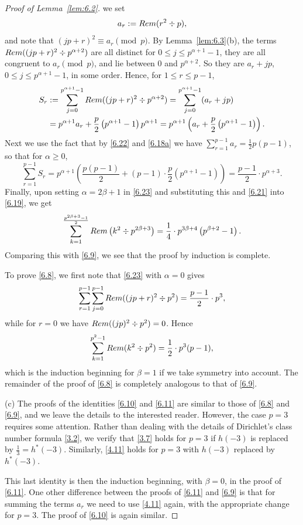 \documentclass[10pt,a4paper]{amsart}
\begin{document}
\begin{proof}[Proof of Lemma~\ref{lem:6.2}]
we set
\begin{equation}\label{6.22}
a_r := {\rm Rem}(r^2\div p),
\end{equation}
and note that $(jp+r)^2\equiv a_r\pmod{p}$. By Lemma~\ref{lem:6.3}(b), the
terms ${\rm Rem}((jp+r)^2\div p^{\alpha+2})$ are all distinct for
$0\leq j\leq p^{\alpha+1}-1$, they are all congruent to $a_r\pmod{p}$, and lie
between 0 and $p^{\alpha+2}$. So they are $a_r+jp$, 
$0\leq j\leq p^{\alpha+1}-1$, in some order. Hence, for $1\leq r\leq p-1$,
\begin{align*}
S_r&:=\sum_{j=0}^{p^{\alpha+1}-1}{\rm Rem}((jp+r)^2\div p^{\alpha+2})
=\sum_{j=0}^{p^{\alpha+1}-1}(a_r+jp) \\
&= p^{\alpha+1}a_r + \frac{p}{2}\left(p^{\alpha+1}-1\right)p^{\alpha+1}
= p^{\alpha+1}\left(a_r+ \frac{p}{2}\left(p^{\alpha+1}-1\right)\right).
\end{align*}
Next we use the fact that by \eqref{6.22} and \eqref{6.18a} we have
$\sum_{r=1}^{p-1}a_r=\frac{1}{2}p(p-1)$, so that for $\alpha\geq 0$,
\begin{equation}\label{6.23}
\sum_{r=1}^{p-1}S_r
=p^{\alpha+1}\left(\frac{p(p-1)}{2}
+(p-1)\cdot\frac{p}{2}\left(p^{\alpha+1}-1\right)\right)
=\frac{p-1}{2}\cdot p^{\alpha+3}.
\end{equation}
Finally, upon setting $\alpha=2\beta+1$ in \eqref{6.23} and substituting this
and \eqref{6.21} into \eqref{6.19}, we get
\[
\sum_{k=1}^{\frac{p^{2\beta+3}-1}{2}}{\rm Rem}\left(k^2\div p^{2\beta+3}\right)
= \frac{1}{4}\cdot p^{3\beta+4}\left(p^{\beta+2}-1\right).
\]
Comparing this with \eqref{6.9}, we see that the proof by induction is complete.

To prove \eqref{6.8}, we first note that \eqref{6.23} with $\alpha=0$ gives
\[
\sum_{r=1}^{p-1}\sum_{j=0}^{p-1}{\rm Rem}((jp+r)^2\div p^2)
= \frac{p-1}{2}\cdot p^3,
\]
while for $r=0$ we have ${\rm Rem}((jp)^2\div p^2)=0$. Hence
\[
\sum_{k=1}^{p^2-1}{\rm Rem}(k^2\div p^2) = \frac{1}{2}\cdot p^3(p-1),
\]
which is the induction beginning for $\beta=1$ if we take symmetry into 
account. The remainder of the proof of \eqref{6.8} is completely analogous to
that of \eqref{6.9}.

(c) The proofs of the identities \eqref{6.10} and \eqref{6.11} are similar to
those of \eqref{6.8} and \eqref{6.9}, and we leave the details to the 
interested reader. However, the case $p=3$ requires some attention. Rather than
dealing with the details of Dirichlet's class number formula \eqref{3.2}, we
verify that \eqref{3.7} holds for $p=3$ if $h(-3)$ is replaced by 
$\frac{1}{3}=h^*(-3)$. Similarly, \eqref{4.11} holds for $p=3$ with $h(-3)$
replaced by $h^*(-3)$.

This last identity is then the induction beginning, with $\beta=0$, in the
proof of \eqref{6.11}. One other difference between the proofs of \eqref{6.11}
and \eqref{6.9} is that for summing the terms $a_r$ we need to use \eqref{4.11}
again, with the appropriate change for $p=3$. The proof of \eqref{6.10} is
again similar.
\end{proof}
\end{document}
